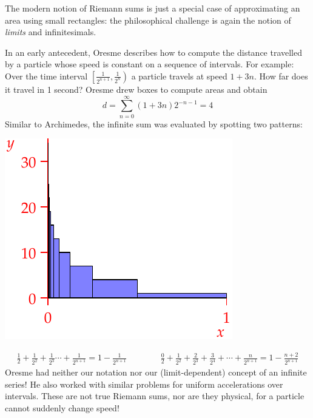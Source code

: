 The modern notion of Riemann sums is just a special case of approximating an area using small rectangles: the philosophical challenge is again the notion of \emph{limits} and infinitesimals.\par
\begin{minipage}[t]{0.58\linewidth}\vspace{-3pt}
In an early antecedent, Oresme describes how to compute the distance travelled by a particle whose speed is constant on a sequence of intervals. For example:\smallbreak
Over the time interval $\left[\tfrac 1{2^{n+1}},\tfrac 1{2^n}\right)$ a particle travels at speed $1+3n$. How far does it travel in 1 second?\smallbreak
Oresme drew boxes to compute areas and obtain
\[d=\sum_{n=0}^\infty(1+3n)2^{-n-1}=4\]
Similar to Archimedes, the infinite sum was evaluated by spotting two patterns:
\end{minipage}\hfill\begin{minipage}[t]{0.4\linewidth}\vspace{-3pt}
\flushright\includegraphics{analytic-oresme}
\end{minipage}\par
\begin{gather*}
\frac 12+\frac 1{2^2}+\frac 1{2^3}\cdots+\frac 1{2^{n+1}}=1-\frac 1{2^{n+1}}\qquad\qquad
\frac 02+\frac 1{2^2}+\frac 2{2^3}+\frac 3{2^4}+\cdots+\frac n{2^{n+1}}=1-\frac{n+2}{2^{n+1}}
\end{gather*}
Oresme had neither our notation nor our (limit-dependent) concept of an infinite series! He also worked with similar problems for uniform accelerations over intervals. These are not true Riemann sums, nor are they physical, for a particle cannot suddenly change speed!
\goodbreak


